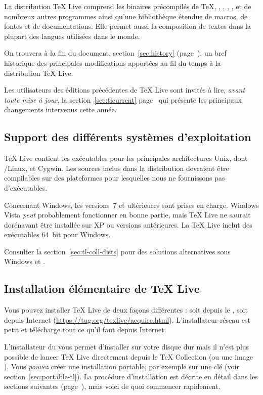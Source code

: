 \documentclass[german, english, french]{article}
\renewcommand{\TL}{\TeX{} Live\xspace}%
\renewcommand{\TK}{\TeX{} Collection\xspace}%
\def\p.{page~}
\begin{document}
La distribution \TL{} comprend les binaires précompilés de \TeX, \LaTeXe,
\ConTeXt, \MF, \MP, \BibTeX{} et de nombreux autres programmes ainsi qu'une
bibliothèque étendue de macros, de fontes et de documentations. Elle permet
aussi la composition de textes dans la plupart des langues utilisées dans le
monde.

On trouvera à la fin du document, section~\ref{sec:history}
(page~\pageref{sec:history}), un bref historique des principales modifications
apportées au fil du temps à la distribution \TL{}.

Les utilisateurs des éditions précédentes de \TL{} sont invités à lire,
\emph{avant toute mise à jour}, la section~\ref{sec:tlcurrent}
page~\pageref{sec:tlcurrent} qui présente les principaux changements intervenus
cette année.

\subsection{Support des différents systèmes d'exploitation}
\label{sec:os-support}

\TL{} contient les exécutables pour les principales architectures Unix, dont
\GNU/Linux, \macOS et Cygwin. Les sources inclus dans la distribution devraient
être compilables sur des plateformes pour lesquelles nous ne fournissons pas
d'exécutables.

Concernant Windows, les versions~7 et ultérieures sont prises en charge.
Windows Vista \emph{peut} probablement fonctionner en bonne partie, mais \TL{} ne
saurait dorénavant être installée sur XP ou versions antérieures.  La \TL{}
inclut des exécutables 64~bit pour Windows.

Consulter la section~\ref{sec:tl-coll-dists} pour des solutions alternatives
sous Windows et \macOS.

\subsection{Installation élémentaire de \protect\TL{}}
\label{sec:basic}

Vous pouvez installer \TL{} de deux façons différentes : soit depuis le \DVD,
soit depuis Internet (\url{https://tug.org/texlive/acquire.html}).
L'installateur réseau est petit et télécharge tout ce qu'il faut depuis
Internet.

L'installateur du \DVD vous permet d'installer sur votre disque dur mais il
n'est plus possible de lancer \TL{} directement depuis le \DVD{} \TK{} (ou une
image ). Vous \emph{pouvez} créer une installation portable, par
exemple sur une clé \USB{} (voir section~\ref{sec:portable-tl}). La procédure
d'installation est décrite en détail dans les sections suivantes
(\p.\pageref{sec:install}), mais voici de quoi commencer rapidement.
\end{document}
